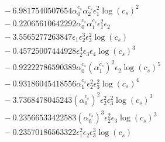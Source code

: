 \documentclass[10pt]{article}
\begin{document}
\begin{align*}
&{}  - 6.9817540507654 \alpha_{0}^{c_s} \alpha_{2}^{c_s} \epsilon_{1}^{2} \log{\left(c_{s} \right)}^{2} \\
&{}  - 0.22065610642292 \alpha_{0}^{c_s} \alpha_{1}^{c_s} \epsilon_{1}^{2} \epsilon_{2} \\
&{}  - 3.5565277263847 \epsilon_{1} \epsilon_{2}^{3} \epsilon_{3}^{2} \log{\left(c_{s} \right)} \\
&{}  - 0.45725007444928 \epsilon_{2}^{4} \epsilon_{3} \epsilon_{4} \log{\left(c_{s} \right)}^{3} \\
&{}  - 0.92222786590389 \alpha_{0}^{c_s} \left(\alpha_{1}^{c_s}\right)^{2} \epsilon_{2} \log{\left(c_{s} \right)}^{5} \\
&{}  - 0.93186045418556 \alpha_{1}^{c_s} \epsilon_{2}^{2} \epsilon_{3}^{2} \log{\left(c_{s} \right)}^{4} \\
&{}  - 3.7368478045243 \left(\alpha_{0}^{c_s}\right)^{2} \epsilon_{2}^{2} \epsilon_{3}^{2} \log{\left(c_{s} \right)}^{3} \\
&{}  - 0.23566533422583 \left(\alpha_{0}^{c_s}\right)^{3} \epsilon_{2}^{2} \epsilon_{3} \log{\left(c_{s} \right)}^{2} \\
&{}  - 0.23570186563322 \epsilon_{1}^{2} \epsilon_{2} \epsilon_{3}^{3} \log{\left(c_{s} \right)}
\end{align*}
\end{document}
